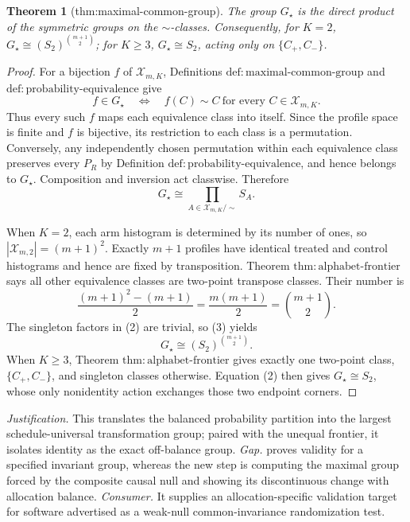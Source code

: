 \documentclass{article}
\newtheorem{theorem}{Theorem}
\begin{document}
\begin{theorem}[thm:maximal-common-group]\label{thm:maximal-common-group}
The group \(G_\star\) is the direct product of the symmetric groups on the \(\sim\)-classes. Consequently, for \(K=2\), \(G_\star\cong(S_2)^{\binom{m+1}{2}}\); for \(K\geq3\), \(G_\star\cong S_2\), acting only on \(\{C_+,C_-\}\).
\end{theorem}
\begin{proof}
For a bijection \(f\) of \(\mathcal X_{m,K}\), Definitions \(\mathrm{def{:}maximal\text{-}common\text{-}group}\) and \(\mathrm{def{:}probability\text{-}equivalence}\) give
\[
 f\in G_\star
 \quad\Longleftrightarrow\quad
 f(C)\sim C\ \text{for every }C\in\mathcal X_{m,K}.
 \tag{1}
\]
Thus every such \(f\) maps each equivalence class into itself. Since the profile space is finite and \(f\) is bijective, its restriction to each class is a permutation. Conversely, any independently chosen permutation within each equivalence class preserves every \(P_R\) by Definition \(\mathrm{def{:}probability\text{-}equivalence}\), and hence belongs to \(G_\star\). Composition and inversion act classwise. Therefore
\[
 G_\star\cong\prod_{A\in\mathcal X_{m,K}/\sim}S_A.
 \tag{2}
\]

When \(K=2\), each arm histogram is determined by its number of ones, so \(|\mathcal X_{m,2}|=(m+1)^2\). Exactly \(m+1\) profiles have identical treated and control histograms and hence are fixed by transposition. Theorem \(\mathrm{thm{:}alphabet\text{-}frontier}\) says all other equivalence classes are two-point transpose classes. Their number is
\[
 \frac{(m+1)^2-(m+1)}2
 =\frac{m(m+1)}2
 =\binom{m+1}{2}.
 \tag{3}
\]
The singleton factors in (2) are trivial, so (3) yields
\[
 G_\star\cong(S_2)^{\binom{m+1}{2}}.
\]
When \(K\geq3\), Theorem \(\mathrm{thm{:}alphabet\text{-}frontier}\) gives exactly one two-point class, \(\{C_+,C_-\}\), and singleton classes otherwise. Equation (2) then gives \(G_\star\cong S_2\), whose only nonidentity action exchanges those two endpoint corners.
\end{proof}
\par\smallskip\noindent \textit{Justification.} This translates the balanced probability partition into the largest schedule-universal transformation group; paired with the unequal frontier, it isolates identity as the exact off-balance group. \textit{Gap.} \cite{HemerikGoeman2018} proves validity for a specified invariant group, whereas the new step is computing the maximal group forced by the composite causal null and showing its discontinuous change with allocation balance. \textit{Consumer.} It supplies an allocation-specific validation target for software advertised as a weak-null common-invariance randomization test.
\end{document}
